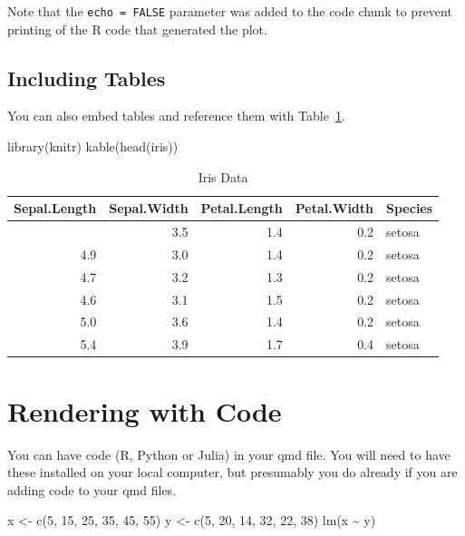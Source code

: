 \documentclass[
  letterpaper,
  oneside,
  open=any]{scrbook}
\newenvironment{Shaded}{\begin{snugshade}}{\end{snugshade}}
\newcommand{\DecValTok}[1]{\textcolor[rgb]{0.68,0.00,0.00}{#1}}
\newcommand{\FunctionTok}[1]{\textcolor[rgb]{0.28,0.35,0.67}{#1}}
\newcommand{\NormalTok}[1]{\textcolor[rgb]{0.00,0.23,0.31}{#1}}
\newcommand{\OtherTok}[1]{\textcolor[rgb]{0.00,0.23,0.31}{#1}}
\newcommand{\SpecialCharTok}[1]{\textcolor[rgb]{0.37,0.37,0.37}{#1}}
\begin{document}
Note that the \texttt{echo\ =\ FALSE} parameter was added to the code
chunk to prevent printing of the R code that generated the plot.

\section{Including Tables}\label{including-tables}

You can also embed tables and reference them with Table~\ref{tbl-iris}.

\begin{Shaded}
\begin{Highlighting}[]
\FunctionTok{library}\NormalTok{(knitr)}
\FunctionTok{kable}\NormalTok{(}\FunctionTok{head}\NormalTok{(iris))}
\end{Highlighting}
\end{Shaded}

\begin{longtable}[]{@{}rrrrl@{}}

\caption{\label{tbl-iris}Iris Data}

\tabularnewline

\toprule\noalign{}
Sepal.Length & Sepal.Width & Petal.Length & Petal.Width & Species \\
\midrule\noalign{}
\endhead
\bottomrule\noalign{}
\endlastfoot
5.1 & 3.5 & 1.4 & 0.2 & setosa \\
4.9 & 3.0 & 1.4 & 0.2 & setosa \\
4.7 & 3.2 & 1.3 & 0.2 & setosa \\
4.6 & 3.1 & 1.5 & 0.2 & setosa \\
5.0 & 3.6 & 1.4 & 0.2 & setosa \\
5.4 & 3.9 & 1.7 & 0.4 & setosa \\

\end{longtable}


\chapter{Rendering with Code}\label{rendering-with-code}

You can have code (R, Python or Julia) in your qmd file. You will need
to have these installed on your local computer, but presumably you do
already if you are adding code to your qmd files.

\begin{Shaded}
\begin{Highlighting}[]
\NormalTok{x }\OtherTok{\textless{}{-}} \FunctionTok{c}\NormalTok{(}\DecValTok{5}\NormalTok{, }\DecValTok{15}\NormalTok{, }\DecValTok{25}\NormalTok{, }\DecValTok{35}\NormalTok{, }\DecValTok{45}\NormalTok{, }\DecValTok{55}\NormalTok{)}
\NormalTok{y }\OtherTok{\textless{}{-}} \FunctionTok{c}\NormalTok{(}\DecValTok{5}\NormalTok{, }\DecValTok{20}\NormalTok{, }\DecValTok{14}\NormalTok{, }\DecValTok{32}\NormalTok{, }\DecValTok{22}\NormalTok{, }\DecValTok{38}\NormalTok{)}
\FunctionTok{lm}\NormalTok{(x }\SpecialCharTok{\textasciitilde{}}\NormalTok{ y)}
\end{Highlighting}
\end{Shaded}
\end{document}
